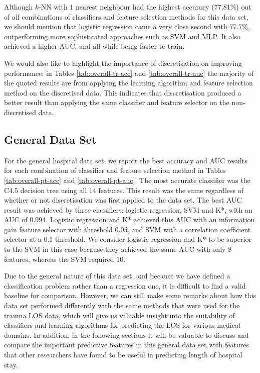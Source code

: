 Although $k$-NN with 1 nearest neighbour had the highest accuracy (77.81\%) out
of all combinations of classifiers and feature selection methods for this data
set, we should mention that logistic regression came a very close second with
77.7\%, outperforming more sophisticated approaches such as SVM and MLP. It
also achieved a higher AUC, and all while being faster to train.

We would also like to highlight the importance of discretisation on improving
performance: in Tables \ref{tab:overall-tr-acc} and
\ref{tab:overall-tr-auc} the majority of the quoted results are from applying
the learning algorithm and feature selection method on the discretised data.
This indicates that discretisation produced a better result than applying the
same classifier and feature selector on the non-discretised data.

\subsection{General Data Set}
For the general hospital data set, we report the best accuracy and AUC results
for each combination of classifier and feature selection method in Tables
\ref{tab:overall-pt-acc} and \ref{tab:overall-pt-auc}. The most accurate
classifier was the C4.5 decision tree using all 14 features.
This result was the same
regardless of whether or not discretisation was first applied to the data set.
The best AUC result was achieved by three classifiers: logistic regression, SVM
and K*, with an AUC of 0.994. Logistic regression and K* achieved this AUC with
an information gain feature selector with threshold 0.05, and SVM with a
correlation coefficient selector at a 0.1 threshold. We consider logistic
regression and K* to be superior to the SVM in this case because they achieved
the same AUC with only 8 features, whereas the SVM required 10.




Due to the general nature of this data set, and because we have defined a
classification problem rather than a regression one, it is difficult to find a
valid baseline for comparison. However, we can still make some remarks about
how this data set performed differently with the same methods that were used
for the trauma LOS data, which will give us valuable insight into the
suitability of classifiers and learning algorithms for predicting the LOS for
various medical domains. In addition, in the following sections it will be
valuable to discuss and compare the important predictive features in this
general data set with features that other researchers have found to be
useful in predicting length of hospital stay.

